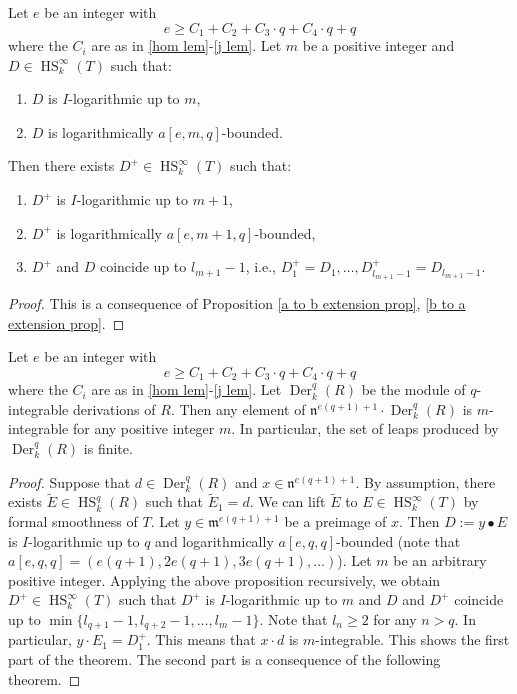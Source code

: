 \documentclass{amsart}
\newcommand{\HS}{\operatorname{HS}}
\begin{document}
\begin{proposition}
    Let $e$ be an integer with
    $$  e\ge C_1+ C_2 + C_3\cdot q+C_4\cdot q+q$$
    where the $C_i$ are as in \ref{hom lem}-\ref{j lem}. Let $m$ be a positive integer and $D\in \HS_k^\infty(T)$ such that:
    \begin{enumerate}
        \item $D$ is $I$-logarithmic up to $m$,
        \item $D$ is logarithmically $a[e,m,q]$-bounded.
    \end{enumerate}    
    Then there exists $D^+\in \HS_k^\infty (T)$ such that:
    \begin{enumerate}
        \item $D^+$ is $I$-logarithmic up to $m+1$,
        \item $D^+$ is logarithmically $a[e,m+1,q]$-bounded,
        \item $D^+$ and $D$ coincide up to $l_{m+1}-1$, i.e., $D^+_1=D_1,\dots,D^+_{l_{m+1}-1}=D_{l_{m+1}-1}$.
        \end{enumerate}
\end{proposition}

\begin{proof}
    This is a consequence of Proposition \ref{a to b extension prop}, \ref{b to a extension prop}.
\end{proof}

\begin{theorem}\label{eq finie thm}
        Let $e$ be an integer with
    $$  e\ge C_1+ C_2 + C_3\cdot q+C_4\cdot q+q$$ where the $C_i$ are as in \ref{hom lem}-\ref{j lem}. Let $\operatorname{Der}_k^{q}(R)$ be the module of $q$-integrable derivations of $R$. Then any element of
    $\mathfrak{n}^{e(q+1)+1} \cdot \operatorname{Der}_k^{q}(R)$
    is $m$-integrable for any positive integer $m$. In particular, the set of leaps produced by $\operatorname{Der}_k^{q}(R)$ is finite.
\end{theorem}

\begin{proof}
    Suppose that $d\in \operatorname{Der}_k^{q}(R)$ and  $x\in \mathfrak{n}^{e(q+1)+1} $. By assumption, there exists $\widetilde{E}\in \HS_k^q(R)$ such that $\widetilde{E}_1=d$. We can lift $\widetilde{E}$ to $E\in \HS_k^\infty(T)$ by formal smoothness of $T$. Let $y\in \mathfrak{m}^{e(q+1)+1}$ be a preimage of $x$. Then $D:=y \bullet E$ is $I$-logarithmic up to $q$ and logarithmically $a[e,q,q]$-bounded (note that $a[e,q,q]=(e(q+1),2e(q+1),3e(q+1),\dots)$). Let $m$ be an arbitrary positive integer. Applying the above proposition recursively, we obtain $D^+\in \HS_k^\infty (T)$ such that $D^+$ is $I$-logarithmic up to $m$ and $D$ and $D^+$ coincide up to $\min\{l_{q+1}-1,l_{q+2}-1,\dots, l_{m}-1\}.$ Note that $l_{n}\ge 2$ for any $n>q$. In particular, $y\cdot E_1=D^+_1$. This means that $x\cdot d$ is $m$-integrable. This shows the first part of the theorem. The second part is a consequence of the following theorem.
    \end{proof}
\end{document}
